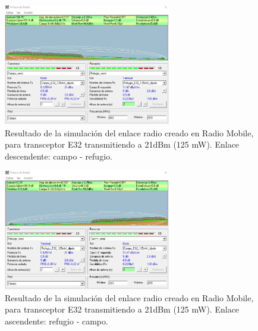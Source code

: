 \documentclass[12pt]{article}
\begin{document}
	\pagebreak
	
	
	\begin{figure}[h!]
		\begin{center}
			\includegraphics[width=0.65\textwidth]{img/resultado_e32_125mW_desc.png}
			\caption{Resultado de la simulación del enlace radio creado en Radio Mobile, para transceptor E32 transmitiendo a 21dBm (125 mW). Enlace descendente: campo - refugio.}
			\label{fig: resultado enlace e32 125mW descendente radio mobile}
		\end{center}
	\end{figure}
	
	
	\begin{figure}[h!]
		\begin{center}
			\includegraphics[width=0.65\textwidth]{img/resultado_e32_125mW_asc.png}
			\caption{Resultado de la simulación del enlace radio creado en Radio Mobile, para transceptor E32 transmitiendo a 21dBm (125 mW). Enlace ascendente: refugio - campo.}
			\label{fig: resultado enlace e32 125mW ascendente radio mobile}
		\end{center}
	\end{figure}
	
\end{document}
